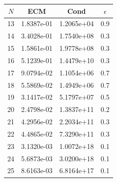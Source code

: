 \documentclass[11pt,a4paper]{article}
\author{Marina Esgueva Ruiz}
\begin{document}
\begin{table}
\centering
\begin{tabular}{|c|ccc|}
\hline
$N$ & ECM & Cond & $\epsilon$ \\
\hline
13&1.8387e-01& 1.2065e+04&0.9\\
14&3.4028e-01&1.7540e+08&0.3\\
15&1.5861e-01&1.9778e+08&0.3\\
16& 5.1239e-01& 1.4479e+10& 0.3\\
17& 9.0794e-02& 1.1054e+06&0.7\\
18& 5.5869e-02& 1.4949e+06&0.7\\
19&3.1417e-02&5.1797e+07&0.5\\
20&2.4798e-02&1.3837e+11&0.2\\
21&4.2956e-02&2.2034e+11&0.3\\
22&4.4865e-02&7.3290e+11&0.3\\
23&3.1320e-03&1.0072e+18&0.1\\
24&5.6873e-03&3.0200e+18& 0.1\\
25&8.6163e-03&6.8164e+17& 0.1\\


\end{tabular}
\end{table}
\end{document}

